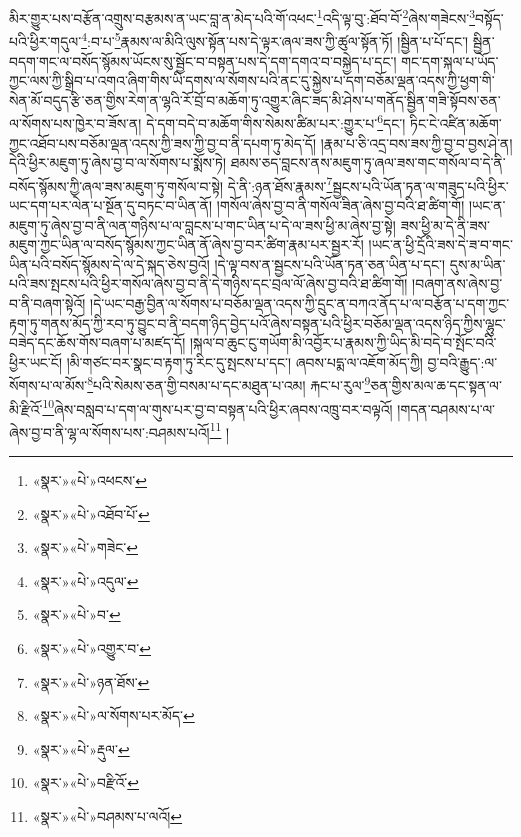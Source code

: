 མིར་གྱུར་པས་བརྩོན་འགྲུས་བརྩམས་ན་ཡང་བླ་ན་མེད་པའི་གོ་འཕང་\footnote{«སྣར་»«པེ་»འཕངས་}འདི་ལྟ་བུ་:ཐོབ་བོ་\footnote{«སྣར་»«པེ་»འཐོབ་པོ་}ཞེས་གཟེངས་\footnote{«སྣར་»«པེ་»གཟེང་}བསྟོད་པའི་ཕྱིར་གདུལ་\footnote{«སྣར་»«པེ་»འདུལ་}:བ་པ་\footnote{«སྣར་»«པེ་»བ་}རྣམས་ལ་མིའི་ལུས་སྟོན་པས་དེ་ལྟར་ཞལ་ཟས་ཀྱི་ཚུལ་སྟོན་ཏོ། །སྦྱིན་པ་པོ་དང་། སྦྱིན་བདག་གང་ལ་བསོད་སྙོམས་ཡོངས་སུ་སྦྱོང་བ་བསྟན་པས་དེ་དག་དགའ་བ་བསྐྱེད་པ་དང་། གང་དག་སྐལ་པ་ཡོད་ཀྱང་ལས་ཀྱི་སྒྲིབ་པ་འགའ་ཞིག་གིས་ཡི་དགས་ལ་སོགས་པའི་ནང་དུ་སྐྱེས་པ་དག་བཅོམ་ལྡན་འདས་ཀྱི་ཕྱག་གི་སེན་མོ་བདུད་རྩི་ཅན་གྱིས་རེག་ན་ལྷའི་རོ་བྲོ་བ་མཆོག་ཏུ་འགྱུར་ཞིང་ཟད་མི་ཤེས་པ་གནོད་སྦྱིན་གཟི་སྟོབས་ཅན་ལ་སོགས་པས་ཁྱེར་བ་ཟོས་ན། དེ་དག་བདེ་བ་མཆོག་གིས་སེམས་ཚིམ་པར་:གྱུར་པ་\footnote{«སྣར་»«པེ་»འགྱུར་བ་}དང་། ཏིང་ངེ་འཛིན་མཆོག་ཀྱང་འཐོབ་པས་བཅོམ་ལྡན་འདས་ཀྱི་ཟས་ཀྱི་བྱ་བ་ནི་དཔག་ཏུ་མེད་དོ། །རྣམ་པ་ཅི་འདྲ་བས་ཟས་ཀྱི་བྱ་བ་བྱས་ཤེ་ན། དེའི་ཕྱིར་མཇུག་ཏུ་ཞེས་བྱ་བ་ལ་སོགས་པ་སྨོས་ཏེ། ཐམས་ཅད་བླངས་ནས་མཇུག་ཏུ་ཞལ་ཟས་གང་གསོལ་བ་དེ་ནི་བསོད་སྙོམས་ཀྱི་ཞལ་ཟས་མཇུག་ཏུ་གསོལ་བ་སྟེ། དེ་ནི་:ཉན་ཐོས་རྣམས་\footnote{«སྣར་»«པེ་»ཉན་ཐོས་}སྦྱངས་པའི་ཡོན་ཏན་ལ་གཟུད་པའི་ཕྱིར་ཡང་དག་པར་ལེན་པ་སྔོན་དུ་བཏང་བ་ཡིན་ནོ། །གསོལ་ཞེས་བྱ་བ་ནི་གསོལ་ཟིན་ཞེས་བྱ་བའི་ཐ་ཚིག་གོ། །ཡང་ན་མཇུག་ཏུ་ཞེས་བྱ་བ་ནི་ལན་གཉིས་པ་ལ་བླངས་པ་གང་ཡིན་པ་དེ་ལ་ཟས་ཕྱི་མ་ཞེས་བྱ་སྟེ། ཟས་ཕྱི་མ་དེ་ནི་ཟས་མཇུག་ཀྱང་ཡིན་ལ་བསོད་སྙོམས་ཀྱང་ཡིན་ནོ་ཞེས་བྱ་བར་ཚིག་རྣམ་པར་སྦྱར་རོ། །ཡང་ན་ཕྱི་དྲོའི་ཟས་དེ་ཟ་བ་གང་ཡིན་པའི་བསོད་སྙོམས་དེ་ལ་དེ་སྐད་ཅེས་བྱའོ། །དེ་ལྟ་བས་ན་སྦྱངས་པའི་ཡོན་ཏན་ཅན་ཡིན་པ་དང་། དུས་མ་ཡིན་པའི་ཟས་སྤངས་པའི་ཕྱིར་གསོལ་ཞེས་བྱ་བ་ནི་དེ་གཉིས་དང་བྲལ་ལོ་ཞེས་བྱ་བའི་ཐ་ཚིག་གོ། །བཞག་ནས་ཞེས་བྱ་བ་ནི་བཞག་སྟེའོ། །དེ་ཡང་བརྒྱ་བྱིན་ལ་སོགས་པ་བཅོམ་ལྡན་འདས་ཀྱི་དྲུང་ན་བཀའ་ནོད་པ་ལ་བརྩོན་པ་དག་ཀྱང་རྟག་ཏུ་གནས་མོད་ཀྱི་རབ་ཏུ་བྱུང་བ་ནི་བདག་ཉིད་བྱེད་པའོ་ཞེས་བསྟན་པའི་ཕྱིར་བཅོམ་ལྡན་འདས་ཉིད་ཀྱིས་ལྷུང་བཟེད་དང་ཆོས་གོས་བཞག་པ་མཛད་དོ། །སྐལ་བ་ཆུང་ངུ་གཡོག་མི་འབྱོར་པ་རྣམས་ཀྱི་ཡིད་མི་བདེ་བ་སྤོང་བའི་ཕྱིར་ཡང་ངོ། །མི་གཙང་བར་སྣང་བ་རྟག་ཏུ་རིང་དུ་སྤངས་པ་དང་། ཞབས་པདྨ་ལ་འཇོག་མོད་ཀྱི། བྱ་བའི་རྒྱུད་:ལ་སོགས་པ་ལ་མོས་\footnote{«སྣར་»«པེ་»ལ་སོགས་པར་མོད་}པའི་སེམས་ཅན་གྱི་བསམ་པ་དང་མཐུན་པ་འམ། རྐང་པ་རུལ་\footnote{«སྣར་»«པེ་»རྡུལ་}ཅན་གྱིས་མལ་ཆ་དང་སྟན་ལ་མི་རྫིའོ་\footnote{«སྣར་»«པེ་»བརྫིའོ་}ཞེས་བསླབ་པ་དག་ལ་གུས་པར་བྱ་བ་བསྟན་པའི་ཕྱིར་ཞབས་འཁྲུ་བར་བལྟའོ། །གདན་བཤམས་པ་ལ་ཞེས་བྱ་བ་ནི་ལྷ་ལ་སོགས་པས་:བཤམས་པའོ།\footnote{«སྣར་»«པེ་»བཤམས་པ་ལའོ།} །
